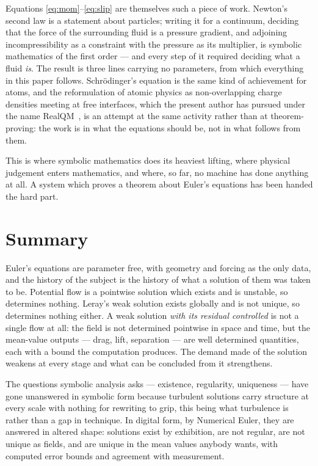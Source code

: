 \documentclass[11pt]{article}
\begin{document}
Equations \eqref{eq:mom}--\eqref{eq:slip} are themselves such a piece of work. Newton's second law is
a statement about particles; writing it for a continuum, deciding that the force of the surrounding
fluid is a pressure gradient, and adjoining incompressibility as a constraint with the pressure as
its multiplier, is symbolic mathematics of the first order --- and every step of it required deciding
what a fluid \emph{is}. The result is three lines carrying no parameters, from which everything in
this paper follows. Schr\"odinger's equation is the same kind of achievement for atoms, and the
reformulation of atomic physics as non-overlapping charge densities meeting at free interfaces, which
the present author has pursued under the name RealQM~\cite{realqm}, is an attempt at the same activity rather
than at theorem-proving: the work is in what the equations should be, not in what follows from them.

This is where symbolic mathematics does its heaviest lifting, where physical judgement enters
mathematics, and where, so far, no machine has done anything at all. A system which proves a theorem
about Euler's equations has been handed the hard part.

\section{Summary}\label{sec:summary}

Euler's equations are parameter free, with geometry and forcing as the only data, and the history of
the subject is the history of what a solution of them was taken to be. Potential flow is a pointwise
solution which exists and is unstable, so determines nothing. Leray's weak solution exists globally
and is not unique, so determines nothing either. A weak solution \emph{with its residual controlled}
is not a single flow at all: the field is not determined pointwise in space and time, but the
mean-value outputs --- drag, lift, separation --- are well determined quantities, each with a bound
the computation produces. The demand made of the solution weakens at every stage
and what can be concluded from it strengthens.

The questions symbolic analysis asks --- existence, regularity, uniqueness --- have gone unanswered
in symbolic form because turbulent solutions carry structure at every scale with nothing for
rewriting to grip, this being what turbulence is rather than a gap in technique. In digital form, by
Numerical Euler, they are answered in altered shape: solutions exist by exhibition, are not regular,
are not unique as fields, and are unique in the mean values anybody wants, with computed error bounds
and agreement with measurement.
\end{document}
